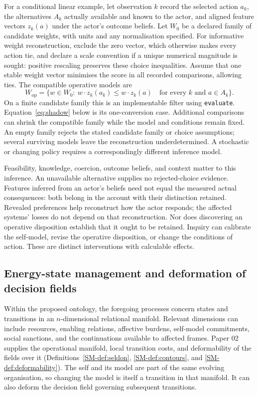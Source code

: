 \documentclass[11pt,a4paper]{article}
\theoremstyle{remark}
\begin{document}
For a conditional linear example, let observation $k$ record the selected action
$a_k$, the alternatives $A_k$ actually available and known to the actor, and
aligned feature vectors $z_k(a)$ under the actor's outcome beliefs. Let $W_0$
be a declared family of candidate weights, with units and any normalisation
specified. For informative weight reconstruction, exclude the zero vector,
which otherwise makes every action tie, and declare a scale convention if a
unique numerical magnitude is sought: positive rescaling preserves these
choice inequalities. Assume that one stable weight vector minimises the score
in all recorded comparisons, allowing ties. The compatible operative models are
\begin{equation}\label{eq:revealed-self}
W_{\mathrm{op}}=
\{w\in W_0:\ w\cdot z_k(a_k)\leq w\cdot z_k(a)
\quad\text{for every }k\text{ and }a\in A_k\}.
\end{equation}
On a finite candidate family this is an implementable filter using
\texttt{evaluate}. Equation~\eqref{eq:shadow} below is its one-conversion case.
Additional comparisons can shrink the compatible family while the model and
conditions remain fixed. An empty family rejects the stated candidate family
or choice assumptions; several surviving models leave the reconstruction
underdetermined. A stochastic or changing policy requires a correspondingly
different inference model.

Feasibility, knowledge, coercion, outcome beliefs, and context matter to this
inference. An unavailable alternative supplies no rejected-choice evidence.
Features inferred from an actor's beliefs need not equal the measured actual
consequences: both belong in the account with their distinction retained.
Revealed preferences help reconstruct how the actor responds; the affected
systems' losses do not depend on that reconstruction. Nor does discovering an
operative disposition establish that it ought to be retained. Inquiry can
calibrate the self-model, revise the operative disposition, or change the
conditions of action. These are distinct interventions with calculable effects.

\subsection{Energy-state management and deformation of decision fields}

Within the proposed ontology, the foregoing processes concern states and
transitions in an $n$-dimensional relational manifold. Relevant dimensions can
include resources, enabling relations, affective burdens, self-model commitments,
social sanctions, and the continuations available to affected frames. Paper 02
supplies the operational manifold, local transition costs, and deformability of
the fields over it (Definitions~\ref{SM-def:seldon}, \ref{SM-def:contours}, and
\ref{SM-def:deformability}). The self and its model are part of the same evolving
organisation, so changing the model is itself a transition in that manifold.
It can also deform the decision field governing subsequent transitions.
\end{document}
